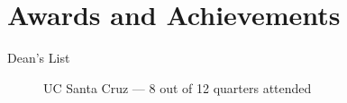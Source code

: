 \documentclass[10pt]{article}
\begin{document}
\section*{Awards and Achievements}
\begin{description}
  \item[Dean's List] UC Santa Cruz --- 8 out of 12 quarters attended
\end{description}
\end{document}

